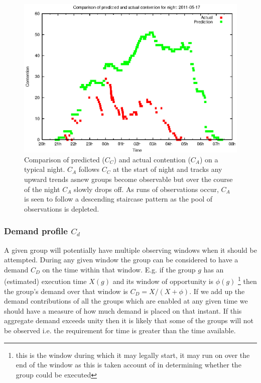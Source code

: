 \begin{figure}[htbp]  
  \begin{center}
    \includegraphics[scale=0.8, angle=0]{figures/contention_2011-05-17.eps}
  \end{center}
  \caption[ Comparison of predicted and actual contention on a typical night.]
   {Comparison of predicted ($C_C$) and actual contention ($C_A$) on a typical night. $C_A$ follows $C_C$ at the start of night and tracks any upward trends asnew groups become observable but over the course of the night $C_A$ slowly drops off. As runs of observations occur, $C_A$ is seen to follow a descending staircase pattern as the pool of observations is depleted.}
  \label{fig:contention_plot}
\end{figure}


\subsubsection{Demand profile $C_d$}
 A given group will potentially have multiple observing windows when it should be attempted. During any given window the group can be considered to have a demand $C_D$ on the time within that window. E.g. if the group $g$ has an (estimated) execution time $X(g)$ and its window of opportunity is $\phi(g)$ \footnote[1]{this is the window during which it may legally start, it may run on over the end of the window as this is taken account of in determining whether the group could be executed} then the group's demand over that window is $C_D=X/(X+\phi)$. If we add up the demand contributions of all the groups which are enabled at any given time we should have a measure of how much demand is placed on that instant. If this aggregate demand exceeds unity then it is likely that some of the groups will not be observed i.e. the requirement for time is greater than the time available. 

